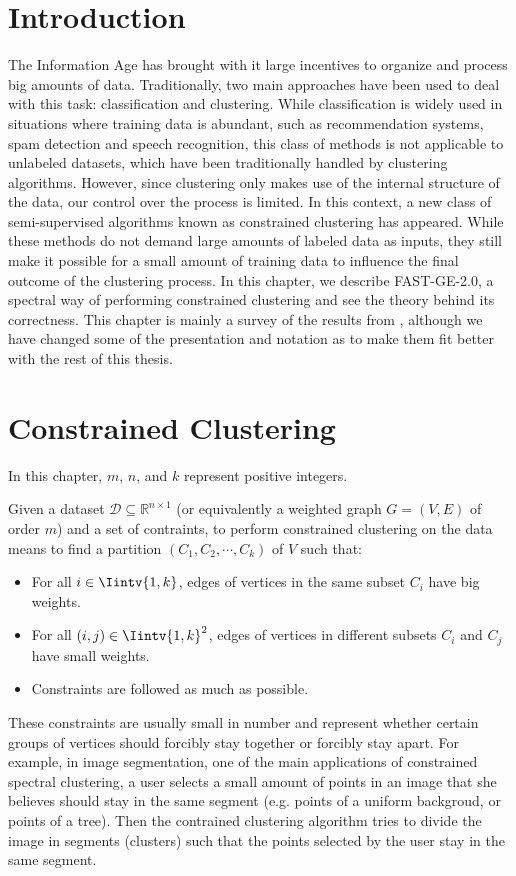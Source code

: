 \section{Introduction}

The Information Age has brought with it large incentives to organize and process big amounts of data.
Traditionally, two main approaches have been used to deal with this task: classification and clustering.
While classification is widely used in situations where training data is abundant, such as recommendation systems, spam detection and speech recognition, this class of methods is not applicable to unlabeled datasets, which have been traditionally handled by clustering algorithms.
However, since clustering only makes use of the internal structure of the data, our control over the process is limited.
In this context, a new class of semi-supervised algorithms known as constrained clustering has appeared.
While these methods do not demand large amounts of labeled data as inputs, they still make it possible for a small amount of training data to influence the final outcome of the clustering process.
In this chapter, we describe FAST-GE-2.0, a spectral way of performing constrained clustering and see the theory behind its correctness.
This chapter is mainly a survey of the results from \cite{fastge2}, although we have changed some of the presentation and notation as to make them fit better with the rest of this thesis.

\section{Constrained Clustering}
In this chapter, $m$, $n$, and $k$ represent positive integers.

Given a dataset $\mathcal D \subseteq \mathbb{R}^{n \times 1}$ (or equivalently a weighted graph $G = (V,E)$ of order $m$) and a set of contraints, to perform constrained clustering on the data means to find a partition $(C_1, C_2, \cdots, C_k)$ of $V$ such that:
\begin{itemize}
   \item For all $i \in \Iintv{1,k}$, edges of vertices in the same subset $C_i$ have big weights.
   \item For all $(i,j) \in \Iintv{1,k}^2$, edges of vertices in different subsets $C_i$ and $C_j$ have small weights.
   \item Constraints are followed as much as possible.
\end{itemize}
These constraints are usually small in number and represent whether certain groups of vertices should forcibly stay together or forcibly stay apart.
For example, in image segmentation, one of the main applications of constrained spectral clustering, a user selects a small amount of points in an image that she believes should stay in the same segment (e.g. points of a uniform backgroud, or points of a tree). Then the contrained clustering algorithm tries to divide the image in segments (clusters) such that the points selected by the user stay in the same segment.


